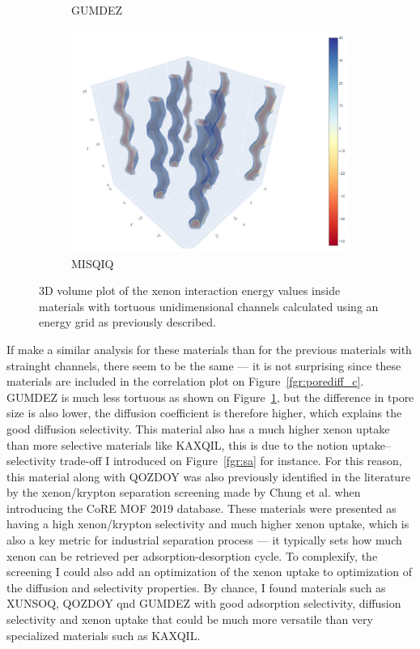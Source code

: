 \documentclass[main]{subfiles}
\begin{document}
\begin{figure}[ht]
\begin{subfigure}[b]{0.3\textwidth}
      \caption{GUMDEZ~\cite{Yin_2014}}\label{fgr:zigzag_b}
  \end{subfigure}
  \hfill
  \begin{subfigure}[b]{0.3\textwidth}
      \centering
      \includegraphics[width=\textwidth]{figures/5-diffusion/viz/MISQIQ.jpg}
      \caption{MISQIQ~\cite{Tong_2013}}\label{fgr:zigzag_c}
  \end{subfigure}
     \caption{ 3D volume plot of the xenon interaction energy values inside materials with tortuous unidimensional channels calculated using an energy grid as previously described.}\label{fgr:zigzag}
\end{figure}

If make a similar analysis for these materials than for the previous materials with strainght channels, there seem to be the same --- it is not surprising since these materials are included in the correlation plot on Figure~\ref{fgr:porediff_c}. GUMDEZ is much less tortuous as shown on Figure~\ref{fgr:zigzag_b}, but the difference in tpore size is also lower, the diffusion coefficient is therefore higher, which explains the good diffusion selectivity. This material also has a much higher xenon uptake than more selective materials like KAXQIL, this is due to the notion uptake--selectivity trade-off I introduced on Figure~\ref{fgr:sa} for instance. For this reason, this material along with QOZDOY was also previously identified in the literature by the xenon/krypton separation screening made by Chung et al.\autocite{Chung_2019} when introducing the CoRE MOF 2019 database. These materials were presented as having a high xenon/krypton selectivity and much higher xenon uptake, which is also a key metric for industrial separation process --- it typically sets how much xenon can be retrieved per adsorption-desorption cycle. To complexify, the screening I could also add an optimization of the xenon uptake to optimization of the diffusion and selectivity properties. By chance, I found materials such as XUNSOQ, QOZDOY qnd GUMDEZ with good adsorption selectivity, diffusion selectivity and xenon uptake that could be much more versatile than very specialized materials such as KAXQIL. 
\end{document}
